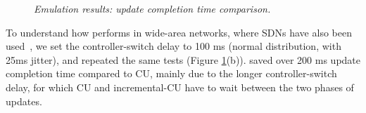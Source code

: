 \begin{figure}[!th]
  \centering
  \vspace{-0.1in}
  \vspace{-0.1in}
  \vspace{-0.1in}
  \caption{\em \small Emulation results: update completion time comparison.}
  \vspace{-0.3in}
  \label{fig:emulation}
\end{figure}

To understand how \name performs in wide-area networks, 
where SDNs have also been used~\cite{jain2013b4, Hong13}, 
we set the controller-switch delay to 100 ms (normal distribution, 
with 25ms jitter), and repeated the same tests (Figure \ref{fig:emulation}(b)). 
\name saved over 200 ms update completion time compared to CU,  mainly due to the longer controller-switch delay, for which CU and incremental-CU have to wait between the two phases of updates. %

